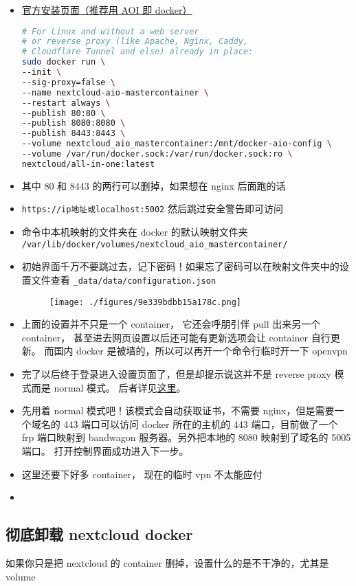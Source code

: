 
\begin{itemize}
\item \href{https://nextcloud.com/install/}{官方安装页面（推荐用 AOI 即 docker）}
\begin{lstlisting}[language=bash]
# For Linux and without a web server
# or reverse proxy (like Apache, Nginx, Caddy,
# Cloudflare Tunnel and else) already in place:
sudo docker run \
--init \
--sig-proxy=false \
--name nextcloud-aio-mastercontainer \
--restart always \
--publish 80:80 \
--publish 8080:8080 \
--publish 8443:8443 \
--volume nextcloud_aio_mastercontainer:/mnt/docker-aio-config \
--volume /var/run/docker.sock:/var/run/docker.sock:ro \
nextcloud/all-in-one:latest
\end{lstlisting}
\item 其中 80 和 8443 的两行可以删掉，如果想在 nginx 后面跑的话
\item \verb`https://ip地址或localhost:5002` 然后跳过安全警告即可访问
\item 命令中本机映射的文件夹在 docker 的默认映射文件夹 \verb`/var/lib/docker/volumes/nextcloud_aio_mastercontainer/`
\item 初始界面千万不要跳过去，记下密码！如果忘了密码可以在映射文件夹中的设置文件查看 \verb`_data/data/configuration.json`
\begin{figure}[ht]
\centering
\texttt{[image: ./figures/9e339bdbb15a178c.png]}
\caption{} \label{fig_nxclou_1}
\end{figure}
\item 上面的设置并不只是一个 container， 它还会呼朋引伴 pull 出来另一个 container， 甚至进去网页设置以后还可能有更新选项会让 container 自行更新。 而国内 docker 是被墙的，所以可以再开一个命令行临时开一下 openvpn
\item 完了以后终于登录进入设置页面了，但是却提示说这并不是 reverse proxy 模式而是 normal 模式。 后者详见\href{https://github.com/nextcloud/all-in-one/blob/main/reverse-proxy.md}{这里}。
\item 先用着 normal 模式吧！该模式会自动获取证书，不需要 nginx，但是需要一个域名的 443 端口可以访问 docker 所在的主机的 443 端口，目前做了一个 frp 端口映射到 bandwagon 服务器。另外把本地的 8080 映射到了域名的 5005 端口。 打开控制界面成功进入下一步。
\item 这里还要下好多 container， 现在的临时 vpn 不太能应付
\item 
\end{itemize}

\subsection{彻底卸载 nextcloud docker}
如果你只是把 nextcloud 的 container 删掉，设置什么的是不干净的，尤其是 volume

